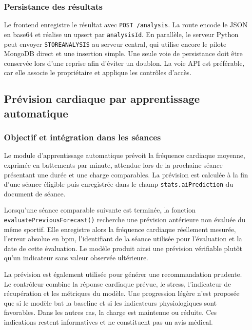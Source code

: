 \documentclass[11pt,a4paper]{article}
\newcommand{\code}[1]{\nolinkurl{#1}}
\begin{document}
\subsubsection{Persistance des résultats}

Le frontend enregistre le résultat avec \code{POST /analysis}. La route encode le JSON en base64 et réalise un upsert par \code{analysisId}. En parallèle, le serveur Python peut envoyer \code{STOREANALYSIS} au serveur central, qui utilise encore le pilote MongoDB direct et une insertion simple. Une seule voie de persistance doit être conservée lors d'une reprise afin d'éviter un doublon. La voie API est préférable, car elle associe le propriétaire et applique les contrôles d'accès.

\subsection{Prévision cardiaque par apprentissage automatique}

\subsubsection{Objectif et intégration dans les séances}

Le module d'apprentissage automatique prévoit la fréquence cardiaque moyenne, exprimée en battements par minute, attendue lors de la prochaine séance présentant une durée et une charge comparables. La prévision est calculée à la fin d'une séance éligible puis enregistrée dans le champ \code{stats.aiPrediction} du document de séance.

Lorsqu'une séance comparable suivante est terminée, la fonction \code{evaluatePreviousForecast()} recherche une prévision antérieure non évaluée du même sportif. Elle enregistre alors la fréquence cardiaque réellement mesurée, l'erreur absolue en bpm, l'identifiant de la séance utilisée pour l'évaluation et la date de cette évaluation. Le modèle produit ainsi une prévision vérifiable plutôt qu'un indicateur sans valeur observée ultérieure.

La prévision est également utilisée pour générer une recommandation prudente. Le contrôleur combine la réponse cardiaque prévue, le stress, l'indicateur de récupération et les métriques du modèle. Une progression légère n'est proposée que si le modèle bat la baseline et si les indicateurs physiologiques sont favorables. Dans les autres cas, la charge est maintenue ou réduite. Ces indications restent informatives et ne constituent pas un avis médical.
\end{document}
